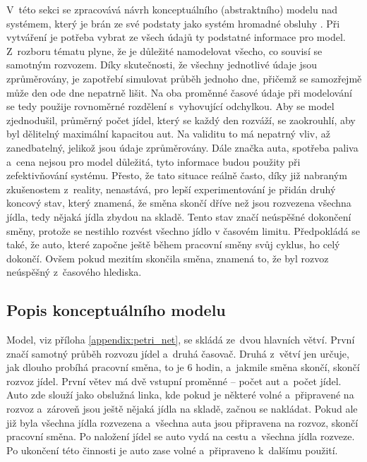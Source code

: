 \documentclass[a4paper, 11pt]{article}
\begin{document}
	V~této sekci se zpracovává návrh konceptuálního (abstraktního) modelu
	\cite[snímek 48]{IMS_slides} nad systémem, který je brán ze své podstaty
	jako systém hromadné obsluhy \cite[snímek 136]{IMS_slides}. Při vytváření
	je potřeba vybrat ze všech údajů ty podstatné informace pro model.
	Z~rozboru tématu plyne, že je důležité namodelovat všecho, co souvisí se
	samotným rozvozem. Díky skutečnosti, že všechny jednotlivé údaje jsou
	zprůměrovány, je zapotřebí simulovat průběh jednoho dne, přičemž se
	samozřejmě může den ode dne nepatrně lišit.	Na oba proměnné časové údaje
	při modelování se tedy použije rovnoměrné rozdělení
	\cite[snímek 89]{IMS_slides} s~vyhovující odchylkou. Aby se model
	zjednodušil, průměrný počet jídel, který se každý den rozváží, se
	zaokrouhlí, aby byl dělitelný maximální kapacitou aut. Na validitu to má
	nepatrný vliv, až zanedbatelný, jelikož jsou údaje zprůměrovány. Dále
	značka auta, spotřeba paliva a~cena nejsou pro model důležitá, tyto
	informace budou použity při zefektivňování systému. Přesto, že tato
	situace reálně často, díky již nabraným zkušenostem z~reality, nenastává,
	pro lepší experimentování je přidán druhý koncový stav, který znamená,
	že směna skončí dříve než jsou rozvezena všechna jídla, tedy nějaká
	jídla zbydou na skladě. Tento stav značí neúspěšné dokončení směny,
	protože se nestihlo rozvést všechno jídlo v časovém limitu. Předpokládá se
	také, že auto, které započne ještě během pracovní směny svůj cyklus, ho
	celý dokončí. Ovšem pokud mezitím skončila směna, znamená to, že byl
	rozvoz neúspěšný z~časového hlediska.


	\subsection{Popis konceptuálního modelu}
	\label{section:conceptual_model_desc}

	Model, viz příloha \ref{appendix:petri_net}, se skládá ze~dvou hlavních
	větví. První značí samotný průběh rozvozu jídel a~druhá časovač. Druhá
	z~větví jen určuje, jak dlouho probíhá pracovní směna, to je 6 hodin,
	a~jakmile směna skončí, skončí rozvoz jídel. První větev má dvě vstupní
	proměnné -- počet aut a~počet jídel. Auto zde slouží jako obslužná linka,
	kde pokud je některé volné a~připravené na rozvoz a~zároveň jsou ještě
	nějaká jídla na skladě, začnou se nakládat. Pokud ale již byla všechna
	jídla rozvezena a~všechna auta jsou připravena na rozvoz, skončí pracovní
	směna. Po naložení jídel se auto vydá na cestu a~všechna jídla rozveze.
	Po ukončení této činnosti je auto zase volné a~připraveno k~dalšímu použití.
\end{document}
